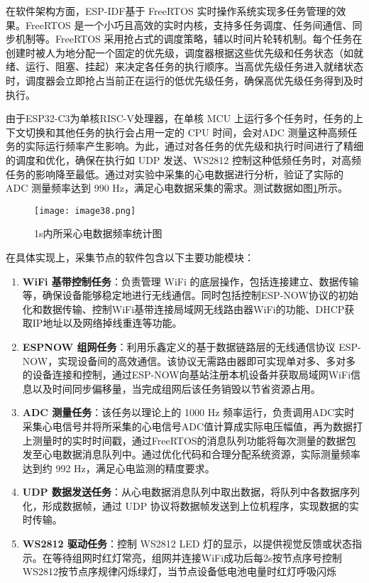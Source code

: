 在软件架构方面，ESP-IDF基于 FreeRTOS 实时操作系统实现多任务管理的效果。FreeRTOS 是一个小巧且高效的实时内核，支持多任务调度、任务间通信、同步机制等。FreeRTOS 采用抢占式的调度策略，辅以时间片轮转机制。每个任务在创建时被人为地分配一个固定的优先级，调度器根据这些优先级和任务状态（如就绪、运行、阻塞、挂起）来决定各任务的执行顺序。当高优先级任务进入就绪状态时，调度器会立即抢占当前正在运行的低优先级任务，确保高优先级任务得到及时执行。

由于ESP32-C3为单核RISC-V处理器，在单核 MCU 上运行多个任务时，任务的上下文切换和其他任务的执行会占用一定的 CPU 时间，会对ADC 测量这种高频任务的实际运行频率产生影响。为此，通过对各任务的优先级和执行时间进行了精细的调度和优化，确保在执行如 UDP 发送、WS2812 控制这种低频任务时，对高频任务的影响降至最低。通过对实验中采集的心电数据进行分析，验证了实际的 ADC 测量频率达到 990 Hz，满足心电数据采集的需求。测试数据如图\ref{F.ECG_image38}所示。

\begin{figure}[htb]
    \centering
    \texttt{[image: image38.png]}
    \caption{1s内所采心电数据频率统计图}
    \label{F.ECG_image38}
\end{figure}

在具体实现上，采集节点的软件包含以下主要功能模块：

\begin{enumerate}
    \item \textbf{WiFi 基带控制任务}：负责管理 WiFi 的底层操作，包括连接建立、数据传输等，确保设备能够稳定地进行无线通信。同时包括控制ESP-NOW协议的初始化和数据传输、控制WiFi基带连接局域网无线路由器WiFi的功能、DHCP获取IP地址以及网络掉线重连等功能。
    
    \item \textbf{ESPNOW 组网任务}：利用乐鑫定义的基于数据链路层的无线通信协议 ESP-NOW，实现设备间的高效通信。该协议无需路由器即可实现单对多、多对多的设备连接和控制，通过ESP-NOW向基站注册本机设备并获取局域网WiFi信息以及时间同步偏移量，当完成组网后该任务销毁以节省资源占用。

    \item \textbf{ADC 测量任务}：该任务以理论上的 1000 Hz 频率运行，负责调用ADC实时采集心电信号并将所采集的心电信号ADC值计算成实际电压幅值，再为数据打上测量时的实时时间戳，通过FreeRTOS的消息队列功能将每次测量的数据包发至心电数据消息队列中。通过优化代码和合理分配系统资源，实际测量频率达到约 992 Hz，满足心电监测的精度要求。
    
    \item \textbf{UDP 数据发送任务}：从心电数据消息队列中取出数据，将队列中各数据序列化，形成数据帧，通过 UDP 协议将数据帧发送到上位机程序，实现数据的实时传输。

    \item \textbf{WS2812 驱动任务}：控制 WS2812 LED 灯的显示，以提供视觉反馈或状态指示。在等待组网时红灯常亮，组网并连接WiFi成功后每2s按节点序号控制WS2812按节点序规律闪烁绿灯，当节点设备低电池电量时红灯呼吸闪烁
\end{enumerate}

